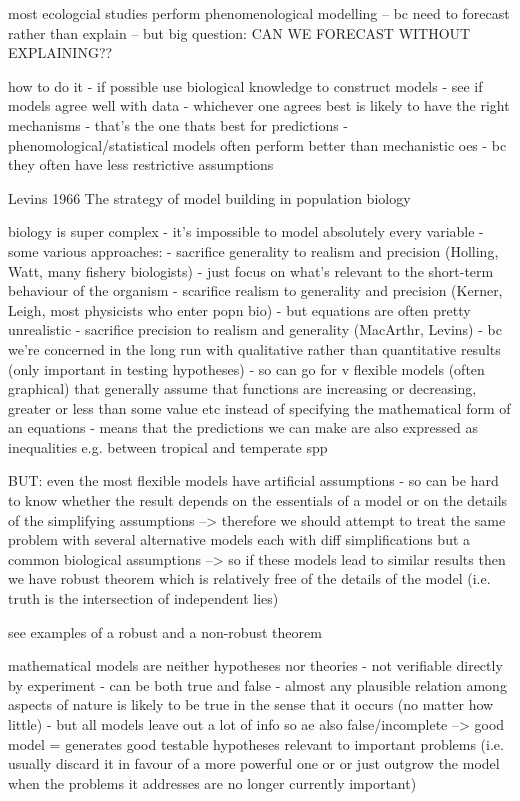 \documentclass[11pt]{article}
\begin{document}
	
	most ecologcial studies perform phenomenological modelling 
	-- bc need to forecast rather than explain
	-- but big question: CAN WE FORECAST WITHOUT EXPLAINING??
	
	
	how to do it
	- if possible use biological knowledge to construct models
	- see if models agree well with data
	- whichever one agrees best is likely to have the right mechanisms
	- that's the one thats best for predictions
	- phenomological/statistical models often perform better than mechanistic oes - bc they often have less restrictive assumptions
	
	
	
	
	
	
	
	
	
	
	Levins 1966 The strategy of model building in population biology \cite{levins1966strategy}
	
	biology is super complex - it's impossible to model absolutely every variable
	- some various approaches:
	- sacrifice generality to realism and precision (Holling, Watt, many fishery biologists)
	- just focus on what's relevant to the short-term behaviour of the organism
	- scarifice realism to generality and precision (Kerner, Leigh, most physicists who enter popn bio)
	- but equations are often pretty unrealistic
	- sacrifice precision to realism and generality (MacArthr, Levins)
	- bc we're concerned in the long run with qualitative rather than quantitative results (only important in testing hypotheses)
	- so can go for v flexible models (often graphical) that generally assume that functions are increasing or decreasing, greater or less than some value etc instead of specifying the mathematical form of an equations
	- means that the predictions we can make are also expressed as inequalities e.g. between tropical and temperate spp
	
	BUT: even the most flexible models have artificial assumptions
	- so can be hard to know whether the result depends on the essentials of a model or on the details of the simplifying assumptions
	--> therefore we should attempt to treat the same problem with several alternative models each with diff simplifications but a common biological assumptions
	--> so if these models lead to similar results then we have robust theorem which is relatively free of the details of the model
	(i.e. truth is the intersection of independent lies)
	
	see examples of a robust and a non-robust theorem
	
	mathematical models are neither hypotheses nor theories
	- not verifiable directly by experiment
	- can be both true and false
	- almost any plausible relation among aspects of nature is likely to be true in the sense that it occurs (no matter how little)
	- but all models leave out a lot of info so ae also false/incomplete
	--> good model = generates good testable hypotheses relevant to important problems
	(i.e. usually discard it in favour of a more powerful one or or just outgrow the model when the problems it addresses are no longer currently important)
	
\end{document}
